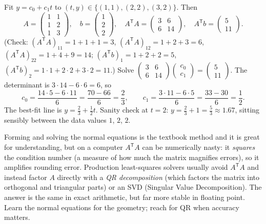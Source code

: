 \begin{example}
\label{ch27:lsq-numeric}
Fit $y=c_0+c_1 t$ to $(t,y)\in\{(1,1),(2,2),(3,2)\}$. Then
$$
A=\begin{pmatrix}1 & 1\\ 1 & 2\\ 1 & 3\end{pmatrix},\quad
b=\begin{pmatrix}1\\ 2\\ 2\end{pmatrix},\quad
A^{\mathsf T}A=\begin{pmatrix}3 & 6\\ 6 & 14\end{pmatrix},\quad
A^{\mathsf T}b=\begin{pmatrix}5\\ 11\end{pmatrix}.
$$
(Check: $(A^{\mathsf T}A)_{11}=1+1+1=3$, $(A^{\mathsf T}A)_{12}=1+2+3=6$,
$(A^{\mathsf T}A)_{22}=1+4+9=14$; $(A^{\mathsf T}b)_1=1+2+2=5$,
$(A^{\mathsf T}b)_2=1\cdot1+2\cdot2+3\cdot2=11$.) Solve
$\begin{pmatrix}3&6\\6&14\end{pmatrix}\begin{pmatrix}c_0\\c_1\end{pmatrix}
=\begin{pmatrix}5\\11\end{pmatrix}$. The determinant is $3\cdot14-6\cdot6=6$, so
$$
c_0=\frac{14\cdot 5-6\cdot 11}{6}=\frac{70-66}{6}=\frac{2}{3},\qquad
c_1=\frac{3\cdot 11-6\cdot 5}{6}=\frac{33-30}{6}=\frac{1}{2}.
$$
The best-fit line is $y=\tfrac{2}{3}+\tfrac{1}{2}t$. Sanity check at $t=2$:
$y=\tfrac23+1=\tfrac53\approx 1.67$, sitting sensibly between the data values $1$,
$2$, $2$.
\end{example}

\begin{trapbox}
Forming and solving the normal equations is the textbook method and it is great
for understanding, but on a computer $A^{\mathsf T}A$ can be numerically nasty: it
\emph{squares} the condition number (a measure of how much the matrix magnifies errors), so it amplifies rounding error. Production
least-squares solvers usually avoid $A^{\mathsf T}A$ and instead factor $A$
directly with a \emph{QR decomposition} (which factors the matrix into orthogonal and triangular parts) or an SVD (Singular Value Decomposition). The answer is the same in exact
arithmetic, but far more stable in floating point. Learn the normal equations for the
geometry; reach for QR when accuracy matters.
\end{trapbox}

